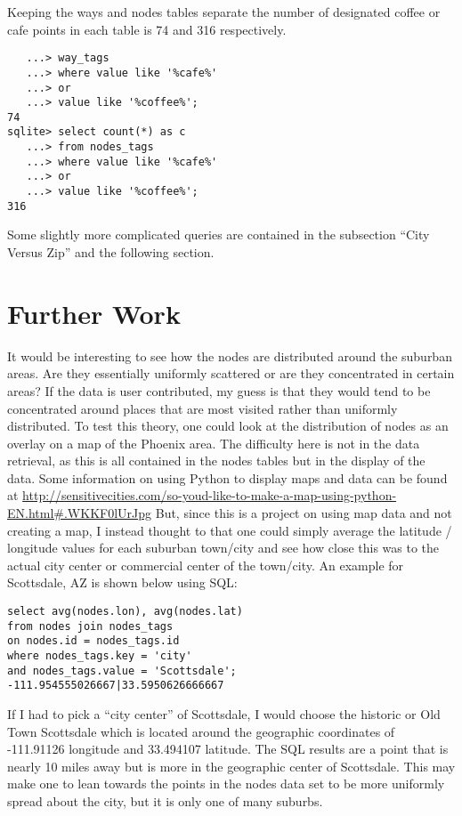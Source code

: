 \documentclass{article}
\begin{document}
Keeping the ways and nodes tables separate the number of designated coffee or cafe points in each table is 74 and 316 respectively.

\begin{verbatim}
   ...> way_tags  
   ...> where value like '%cafe%'
   ...> or
   ...> value like '%coffee%';
74
sqlite> select count(*) as c 
   ...> from nodes_tags
   ...> where value like '%cafe%'
   ...> or           
   ...> value like '%coffee%';
316

\end{verbatim}

Some slightly more complicated queries are contained in the subsection ``City Versus Zip'' and the following section.

\section{Further Work}

It would be interesting to see how the nodes are distributed around the suburban areas.  Are they essentially uniformly scattered or are they concentrated in certain areas?  If the data is user contributed, my guess is that they would tend to be concentrated around places that are most visited rather than uniformly distributed.  To test this theory, one could look at the distribution of nodes as an overlay on a map of the Phoenix area.  The difficulty here is not in the data retrieval, as this is all contained in the nodes tables but in the display of the data.  Some information on using Python to display maps and data can be found at \url{http://sensitivecities.com/so-youd-like-to-make-a-map-using-python-EN.html\#.WKKF0lUrJpg}
But, since this is a project on using map data and not creating a map, I instead thought to that one could simply average the latitude / longitude values for each suburban town/city and see how close this was to the actual city center or commercial center of the town/city.  An example for Scottsdale, AZ is shown below using SQL:

\begin{verbatim}
select avg(nodes.lon), avg(nodes.lat)
from nodes join nodes_tags
on nodes.id = nodes_tags.id
where nodes_tags.key = 'city' 
and nodes_tags.value = 'Scottsdale';
-111.954555026667|33.5950626666667
\end{verbatim}

If I had to pick a ``city center'' of Scottsdale, I would choose the historic or Old Town Scottsdale which is located around the geographic coordinates of -111.91126 longitude and 33.494107 latitude.  The SQL results are a point that is nearly 10 miles away but is more in the geographic center of Scottsdale.  This may make one to lean towards the points in the nodes data set to be more uniformly spread about the city, but it is only one of many suburbs.
\end{document}
